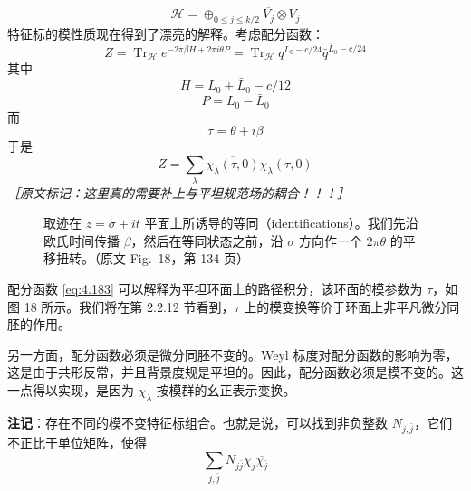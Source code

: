 \begin{equation}
  \mathcal{H}=\oplus_{0\le j\le k/2}\overline{V_j}\otimes V_j
  \tag{4.182}
  \label{eq:4.182}
\end{equation}
特征标的模性质现在得到了漂亮的解释。考虑配分函数：
\begin{equation}
  Z=\operatorname{Tr}_{\mathcal{H}}e^{-2\pi\beta H+2\pi i\theta P}
  =\operatorname{Tr}_{\mathcal{H}}q^{L_0-c/24}\bar{q}^{\bar{L}_0-c/24}
  \tag{4.183}
  \label{eq:4.183}
\end{equation}
其中
\begin{equation}
  H=L_0+\bar{L}_0-c/12
  \tag{4.184}
  \label{eq:4.184}
\end{equation}
\begin{equation}
  P=L_0-\bar{L}_0
  \tag{4.185}
  \label{eq:4.185}
\end{equation}
而
\begin{equation}
  \tau=\theta+i\beta
  \tag{4.186}
  \label{eq:4.186}
\end{equation}
于是
\begin{equation}
  Z=\sum_{\lambda}\overline{\chi_{\lambda}(\tau,0)}\chi_{\lambda}(\tau,0)
  \tag{4.187}
  \label{eq:4.187}
\end{equation}
{\small\itshape ［原文标记：这里真的需要补上与平坦规范场的耦合！！！］}

\begin{figure}[htbp]
  \centering
  \MissingFigureNote
  \caption{取迹在 $z=\sigma+it$ 平面上所诱导的等同（identifications）。我们先沿欧氏时间传播 $\beta$，然后在等同状态之前，沿 $\sigma$ 方向作一个 $2\pi\theta$ 的平移扭转。（原文 Fig.~18，第 134 页）}
  \label{fig:18}
\end{figure}

配分函数 \eqref{eq:4.183} 可以解释为平坦环面上的路径积分，该环面的模参数为 $\tau$，如图 18 所示。我们将在第 2.2.12 节看到，$\tau$ 上的模变换等价于环面上非平凡微分同胚的作用。

另一方面，配分函数必须是微分同胚不变的。Weyl 标度对配分函数的影响为零，这是由于共形反常，并且背景度规是平坦的。因此，配分函数必须是模不变的。这一点得以实现，是因为 $\chi_{\lambda}$ 按模群的幺正表示变换。

\textbf{注记}：存在不同的模不变特征标组合。也就是说，可以找到非负整数 $N_{j,\bar{j}}$，它们不正比于单位矩阵，使得
\begin{equation}
  \sum_{j,\bar{j}}N_{j\bar{j}}\chi_{j}\overline{\chi_{\bar{j}}}
  \tag{4.188}
  \label{eq:4.188}
\end{equation}
